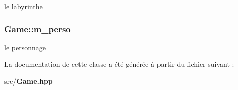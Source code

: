 le labyrinthe 

\subsubsection[{m\-\_\-perso}]{ Game\-::m\-\_\-perso\hspace{0.3cm}{\ttfamily [private]}}\label{class_game_aa61c11c5da4f4b2e977c230d8db13578}


le personnage 



La documentation de cette classe a été générée à partir du fichier suivant \-:\begin{DoxyCompactItemize}
\item 
src/{\bf Game.\-hpp}\end{DoxyCompactItemize}
